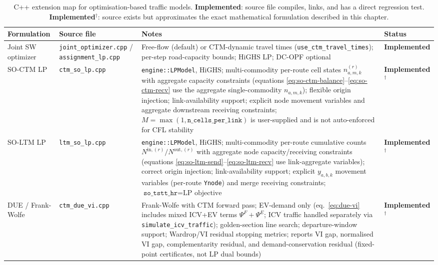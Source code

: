 \begin{table}[htbp]
\centering
\caption{C++ extension map for optimisation-based traffic models.
  \textbf{Implemented}: source file compiles, links, and has a direct
  regression test.
  \textbf{Implemented}$^\dagger$: source exists but approximates the exact
  mathematical formulation described in this chapter.}
\label{tab:cpp-extension}
\begin{tabularx}{\textwidth}{lXXl}
\toprule
Formulation & Source file & Notes & Status \\
\midrule
Joint SW optimizer &
  \texttt{joint\_optimizer.cpp} /
  \texttt{assignment\_lp.cpp} &
  Free-flow (default) or CTM-dynamic travel times
  (\texttt{use\_ctm\_travel\_times}); per-step
  road-capacity bounds; HiGHS LP; DC-OPF optional &
  \textbf{Implemented} \\
SO-CTM LP &
  \texttt{ctm\_so\_lp.cpp} &
  \texttt{engine::LPModel}, HiGHS;
  multi-commodity per-route cell states $n^{(r)}_{a,m,k}$ with
  aggregate capacity constraints (equations \eqref{eq:so-ctm-balance}--\eqref{eq:so-ctm-recv}
  use the aggregate single-commodity $n_{a,m,k}$);
  flexible origin injection; link-availability support;
  explicit node movement variables and aggregate downstream receiving
  constraints; $M=\max(1, \texttt{n\_cells\_per\_link})$ is
  user-supplied and is not auto-enforced for CFL stability &
  \textbf{Implemented}$^\dagger$ \\
SO-LTM LP &
  \texttt{ltm\_so\_lp.cpp} &
  \texttt{engine::LPModel}, HiGHS;
  multi-commodity per-route cumulative counts
  $N^{\text{in},(r)}/N^{\text{out},(r)}$ with aggregate node
  capacity/receiving constraints
  (equations \eqref{eq:so-ltm-send}--\eqref{eq:so-ltm-recv}
  use link-aggregate variables);
  correct origin injection; link-availability support;
  explicit $y_{a,b,k}$ movement variables (per-route \texttt{Ynode})
  and merge receiving constraints;
  $\texttt{so\_tstt\_hr}=\text{LP objective}$ &
  \textbf{Implemented}$^\dagger$ \\
DUE / Frank-Wolfe &
  \texttt{ctm\_due\_vi.cpp} &
  Frank-Wolfe with CTM forward pass; EV-demand only
  (eq.~\eqref{eq:due-vi} includes mixed ICV+EV terms $\Psi^F+\Psi^E$;
  ICV traffic handled separately via \texttt{simulate\_icv\_traffic});
  golden-section line search; departure-window support;
  Wardrop/VI residual stopping metrics; reports VI gap,
  normalised VI gap, complementarity residual, and demand-conservation
  residual (fixed-point certificates, not LP dual bounds) &
  \textbf{Implemented}$^\dagger$ \\

\end{tabularx}
\end{table}
